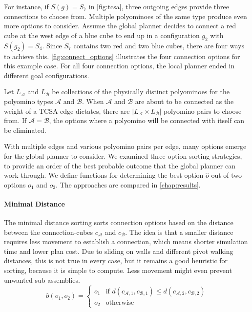 For instance, if $S(g) = S_7$ in \autoref{fig:tcsa}, three outgoing edges provide three connections to choose from.
Multiple polyominoes of the same type produce even more options to consider.
Assume the global planner decides to connect a red cube at the west edge of a blue cube to end up in a configuration $g_2$ with $S(g_2) = S_4$.
Since $S_7$ contains two red and two blue cubes, there are four ways to achieve this.
\autoref{fig:connect_options} illustrates the four connection options for this example case.
For all four connection options, the local planner ended in different goal configurations.

Let $L_\mathcal{A}$ and $L_\mathcal{B}$ be collections of the physically distinct polyominoes for the polyomino types $\mathcal{A}$ and $\mathcal{B}$.
When $\mathcal{A}$ and $\mathcal{B}$ are about to be connected as the weight of a TCSA edge dictates, there are $\left| L_\mathcal{A} \times L_\mathcal{B} \right|$ polyomino pairs to choose from.
If $\mathcal{A} = \mathcal{B}$, the options where a polyomino will be connected with itself can be eliminated.

With multiple edges and various polyomino pairs per edge, many options emerge for the global planner to consider.
We examined three option sorting strategies, to provide an order of the best probable outcome that the global planner can work through. 
We define functions for determining the best option $\hat{o}$ out of two options $o_1$ and $o_2$.
The approaches are compared in \autoref{chap:results}.


\paragraph{Minimal Distance}

The minimal distance sorting sorts connection options based on the distance between the connection-cubes $c_\mathcal{A}$ and $c_\mathcal{B}$.
The idea is that a smaller distance requires less movement to establish a connection, which means shorter simulation time and lower plan cost.
Due to sliding on walls and different pivot walking distances, this is not true in every case, but it remains a good heuristic for sorting, because it is simple to compute.
Less movement might even prevent unwanted sub-assemblies.
\begin{equation}
\hat{o}(o_1, o_2) =
\begin{cases}
o_1 & \text{if } d(c_{\mathcal{A},1}, c_{\mathcal{B},1}) \leq d(c_{\mathcal{A},2}, c_{\mathcal{B},2}) \\
o_2 & \text{otherwise}
\end{cases}
\end{equation}


